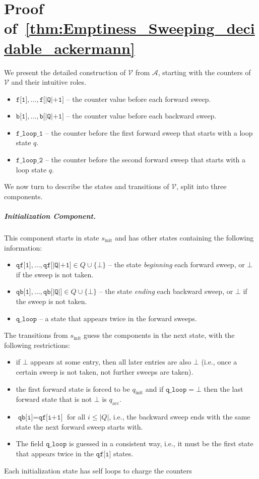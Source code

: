 \documentclass[11pt,a4paper]{amsart}
\theoremstyle{definition}
\newcommand{\initstate}{q_{\mathrm{init}}}
\newcommand{\accstate}{q_{\mathrm{acc}}}
\newcommand{\vf}[1]{\texttt{#1}}
\newcommand{\cA}{\mathcal{A}}
\newcommand{\cV}{\mathcal{V}}
\begin{document}
\section{Proof of~\cref{thm:Emptiness_Sweeping_decidable_ackermann}}
\label{sec:emptiness_sweeping_formal_upper_bound}
We present the detailed construction of $\cV$ from $\cA$, starting with the counters of $\cV$ and
their intuitive roles.
\begin{itemize}
\item $\vf{f[1]},\ldots, \vf{f[|Q|+1]}$ -- the counter value before each forward
sweep.
\item $\vf{b[1]},\ldots, \vf{b[|Q|+1]}$ -- the counter value before each backward
sweep.
\item $\vf{f\_loop\_1}$ -- the counter before the first forward sweep that
starts with a loop state $q$.
\item $\vf{f\_loop\_2}$ -- the counter before the second forward sweep that
starts with a loop state $q$.
\end{itemize} We now turn to describe the states and transitions of $\cV$, split
into three components.
\subparagraph*{Initialization Component.} This component starts in state
$s_{\textrm{init}}$ and has other states containing the following information:
\begin{itemize}
\item $\vf{qf[1]},\ldots,\vf{qf[|Q|+1]}\in Q\cup \{\bot\}$ -- the state \emph{beginning}
each forward sweep, or $\bot$ if the sweep is not taken.
\item $\vf{qb[1]},\ldots,\vf{qb[|Q|]}\in Q\cup \{\bot\}$ -- the state \emph{ending} each
backward sweep, or $\bot$ if the sweep is not taken.
\item $\vf{q\_loop}$ -- a state that appears twice in the forward sweeps.
\end{itemize} The transitions from $s_{\textrm{init}}$ guess the components in
the next state, with the following restrictions:
\begin{itemize}
\item if $\bot$ appears at some entry, then all later entries are also $\bot$
(i.e., once a certain sweep is not taken, not further sweeps are taken).
\item the first forward state is forced to be $\initstate$ and if
$\vf{q\_loop}=\bot$ then the last forward state that is not $\bot$ is $\accstate$.
\item $\vf{qb[i]}=\vf{qf[i+1]}$ for all $i\le |Q|$, i.e., the backward sweep
ends with the same state the next forward sweep starts with.
\item The field $\vf{q\_loop}$ is guessed in a consistent way, i.e., it must
be the first state that appears twice in the $\vf{qf[i]}$ states.
\end{itemize} Each initialization state has self loops to charge the counters
\end{document}
